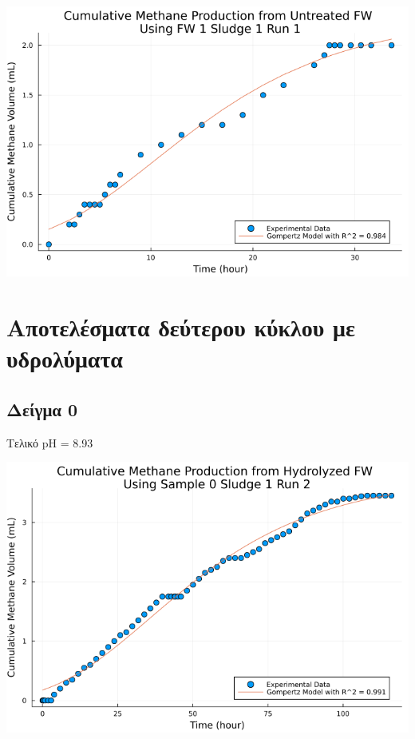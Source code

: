 \documentclass[11pt]{article}
\begin{document}
\begin{center}
\includegraphics[width=.9\linewidth]{../plots/BMPs/Untreated FW/methane_kinetics_untreated_fw_s1_r1_hour.png}
\end{center}

\section{Αποτελέσματα δεύτερου κύκλου με υδρολύματα}
\label{sec:orgcbd04dc}

\subsection{Δείγμα 0}
\label{sec:orgbc641fe}
Τελικό pH = 8.93

\begin{center}
\includegraphics[width=.9\linewidth]{../plots/BMPs/Hydrolyzed FW/methane_kinetics_hydrolysate_0_s1_r2_hour.png}
\end{center}
\end{document}
